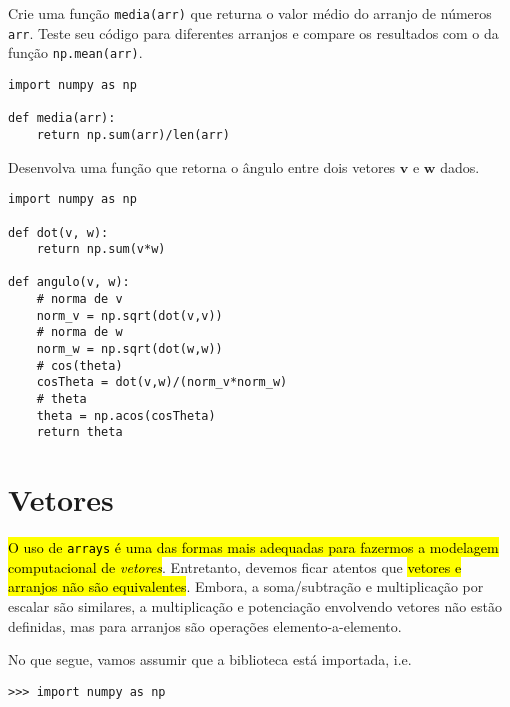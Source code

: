 \begin{exer}
  Crie uma função \lstinline+media(arr)+ que returna o valor médio do arranjo de números \lstinline+arr+. Teste seu código para diferentes arranjos e compare os resultados com o da função \lstinline+np.mean(arr)+.
\end{exer}
\begin{resp}
\begin{lstlisting}
import numpy as np

def media(arr):
    return np.sum(arr)/len(arr)
\end{lstlisting}
\end{resp}

\begin{exer}
  Desenvolva uma função que retorna o ângulo entre dois vetores $\pmb{v}$ e $\pmb{w}$ dados.
\end{exer}
\begin{resp}
\begin{lstlisting}
import numpy as np

def dot(v, w):
    return np.sum(v*w)

def angulo(v, w):
    # norma de v
    norm_v = np.sqrt(dot(v,v))
    # norma de w
    norm_w = np.sqrt(dot(w,w))
    # cos(theta)
    cosTheta = dot(v,w)/(norm_v*norm_w)
    # theta
    theta = np.acos(cosTheta)
    return theta
\end{lstlisting}
\end{resp}


\section{Vetores}\label{cap_arr_sec_vetor}

\hl{O uso de {\lstinline+arrays+} é uma das formas mais adequadas para fazermos a modelagem computacional de \emph{vetores}}. Entretanto, devemos ficar atentos que \hl{vetores e arranjos não são equivalentes}. Embora, a soma/subtração e multiplicação por escalar são similares, a multiplicação e potenciação envolvendo vetores não estão definidas, mas para arranjos são operações elemento-a-elemento.

No que segue, vamos assumir que a biblioteca {\numpy} está importada, i.e.
\begin{lstlisting}
>>> import numpy as np
\end{lstlisting}

